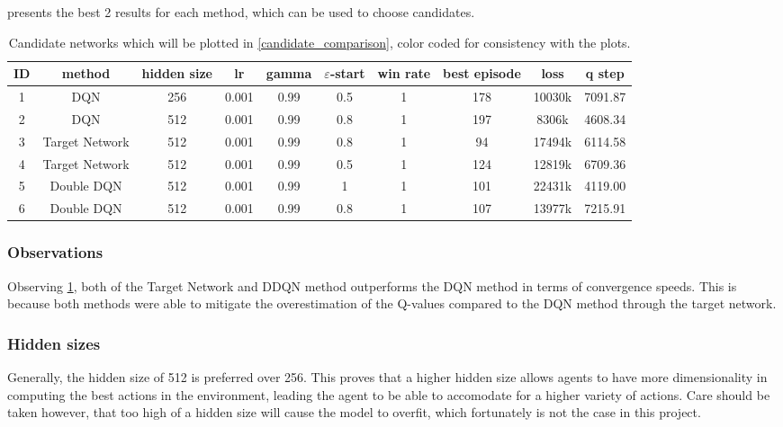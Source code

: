  presents the best 2 results for each method, which can be used to choose candidates.
\begin{table}[h]
	\centering
	\scriptsize
	\begin{tabular}{c c c c c c | c c c c}
		\toprule
		ID & method & hidden size & lr & gamma & $\varepsilon$-start & win rate & best episode & loss & q step \\
  \midrule
		\colorbox{id1}{1} & DQN & 256 & 0.001 & 0.99 & 0.5 & 1 & 178 & 10030k & 7091.87 \\
		\colorbox{id2}{2} & DQN & 512 & 0.001 & 0.99 & 0.8 & 1 & 197 & \phantom{0}8306k & 4608.34 \\
		\colorbox{id3}{3} & Target Network & 512 & 0.001 & 0.99 & 0.8 & 1 & \phantom{0}94 & 17494k & 6114.58 \\
		\colorbox{id4}{4} & Target Network & 512 & 0.001 & 0.99 & 0.5 & 1 & 124 & 12819k & 6709.36 \\
		\colorbox{id5}{5} & Double DQN & 512 & 0.001 & 0.99 & 1 & 1 & 101 & 22431k & 4119.00 \\
		\colorbox{id6}{6} & Double DQN & 512 & 0.001 & 0.99 & 0.8 & 1 & 107 & 13977k & 7215.91 \\
  \bottomrule
  \end{tabular}
	\caption{Candidate networks which will be plotted in \cref{candidate_comparison}, color coded for consistency with the plots.}
	\label{best_results_t2}
\end{table}

\subsubsection{Observations}
Observing \cref{best_results_t2}, both of the Target Network and DDQN method outperforms the DQN method in terms of convergence speeds. This is because both methods were able to mitigate the overestimation of the Q-values compared to the DQN method through the target network.

\subsubsection{Hidden sizes}
Generally, the hidden size of 512 is preferred over 256. This proves that a higher hidden size allows agents to have more dimensionality in computing the best actions in the environment, leading the agent to be able to accomodate for a higher variety of actions. Care should be taken however, that too high of a hidden size will cause the model to overfit, which fortunately is not the case in this project.

